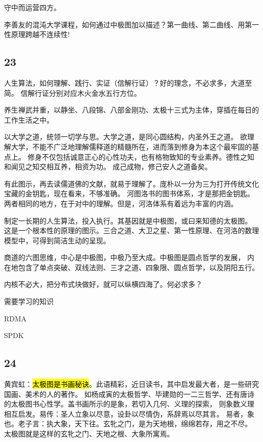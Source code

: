 守中而运营四方。

李善友的混沌大学课程，如何通过中极图加以描述？第一曲线、第二曲线、用第一性原理跨越不连续性!

\subsection{23}

人生算法，如何理解、践行、实证（信解行证）？好的理念，不必求多，大道至简。
信解行证分别对应木火金水五行方位。

养生禅武并重，以静坐、八段锦、八部金刚功、太极十三式为主体，穿插在每日的工作生活之中。

以大学之道，统领一切学与思。大学之道，是同心圆结构，内圣外王之道。
欲理解大学，不能不广泛地理解儒释道的精髓所在，进而落到修身为本这个最牢固的基点上。
修身不仅包括诚意正心的心性功夫，也有格物致知的专业素养。德性之知和闻见之知交相互养，相资为功。
成己成物，修己安人之道备矣。

有此图示，再去读儒道佛的文献，就易于理解了。庞朴以一分为三为打开传统文化宝藏的金钥匙，现在看来，不够准确。
河图洛书的图书体系，才是那把金钥匙。两者相同的地方，在于对中的理解。但是，河洛体系有着远为丰富的内涵。

制定一长期的人生算法，投入执行。其基因就是中极图，或曰来知德的太极图。
这是一个根本性的原理的图示。三合之道、大卫之星、第一性原理、在河洛的数理模型中，可得到简洁生动的呈现。

商道的六图思维，中心是中极图，中极乃至大成。中极图是圆点哲学的发展，
内在地包含了单点突破、双线法则、三才之道、四象限、圆点哲学，以及阴阳五行。

内核不必大，把分布式块做好，就可以纵横四海了。何必求多？

需要学习的知识
\begin{enumbox}
\item RDMA
\item SPDK
\end{enumbox}

\subsection{24}

黄宾虹：\hl{太极图是书画秘诀}。此语精彩，近日读书，其中启发最大者，是一些研究国画、美术的人的著作。
如杨成寅的太极哲学、毕建勋的一二三哲学、还有唐诗的太极图书心性学。盖书画所示的是象，若切入几何、义理的探索，
则象数义理相互启发。易传：圣人立象以尽意，设卦以尽情伪，系辞焉以尽其言。
易者，象也。老子言：执大象，天下往。玄牝之门，是为天地根，绵绵若存，用之不尽。
太极图就是这样的玄牝之门、天地之根、大象所寓焉。

